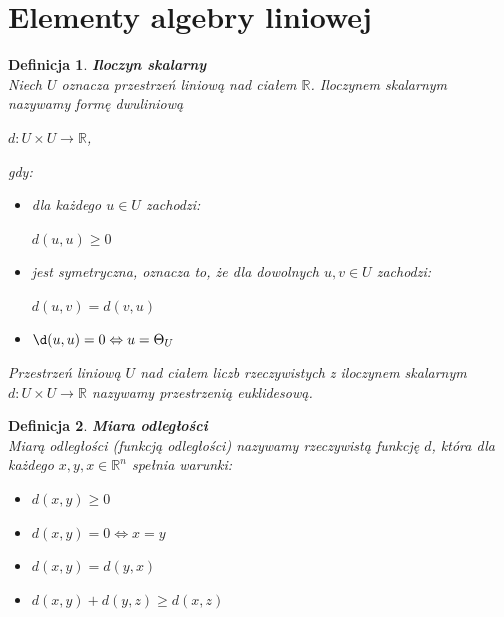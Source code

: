 \documentclass[12pt,a4paper]{report}
\newtheorem{df}{Definicja}
\begin{document}
\section{Elementy algebry liniowej}
\begin{df}\textbf{Iloczyn skalarny}
\\Niech $U$ oznacza przestrzeń liniową nad ciałem $\mathbb{R}$. Iloczynem skalarnym nazywamy formę dwuliniową 
\begin{center}
$d: U \times U \longrightarrow \mathbb{R}$,
\end{center}
gdy:
\begin{itemize}
\item dla każdego $u \in U$ zachodzi:
\begin{center}
$d (u,u) \geq 0$
\end{center}
\item jest symetryczna, oznacza to, że dla dowolnych $u, v \in U$ zachodzi:
\begin{center}
$d(u,v)=d(v,u)$
\end{center}
\item $\d(u,u)=0 \Leftrightarrow u = \Theta_{U}$
\end{itemize}
Przestrzeń liniową $U$ nad ciałem liczb rzeczywistych z iloczynem skalarnym 
\\$d: U \times U \longrightarrow \mathbb{R}$ nazywamy przestrzenią euklidesową.
\end{df}
\begin{df} \textbf{Miara odległości}
\\Miarą odległości (funkcją odległości) nazywamy rzeczywistą funkcję $d$, która dla każdego $x, y, x \in \mathbb{R}^n$ spełnia warunki:
\begin{itemize}
\item $d(x,y)\geq 0$ 
\item $d(x,y) = 0 \Leftrightarrow x = y$ 
\item $d(x,y) = d(y,x)$
\item $d(x,y) + d(y,z) \geq d(x,z)$
\end{itemize}
\end{df}
\end{document}
